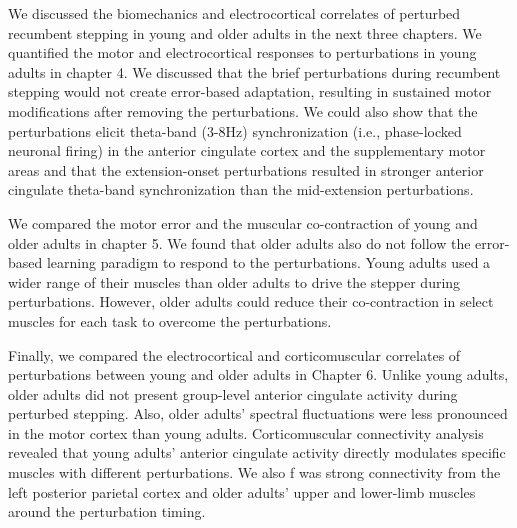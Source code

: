 \documentclass[../thesis_seyed.tex]{subfiles}
\begin{document}
We discussed the biomechanics and electrocortical correlates of perturbed recumbent stepping in young and older adults in the next three chapters. We quantified the motor and electrocortical responses to perturbations in young adults in chapter 4. We discussed that the brief perturbations during recumbent stepping would not create error-based adaptation, resulting in sustained motor modifications after removing the perturbations. We could also show that the perturbations elicit theta-band (3-8Hz) synchronization (i.e., phase-locked neuronal firing) in the anterior cingulate cortex and the supplementary motor areas and that the extension-onset perturbations resulted in stronger anterior cingulate theta-band synchronization than the mid-extension perturbations.

We compared the motor error and the muscular co-contraction of young and older adults in chapter 5. We found that older adults also do not follow the error-based learning paradigm to respond to the perturbations. Young adults used a wider range of their muscles than older adults to drive the stepper during perturbations. However, older adults could reduce their co-contraction in select muscles for each task to overcome the perturbations.

Finally, we compared the electrocortical and corticomuscular correlates of perturbations between young and older adults in Chapter 6. Unlike young adults, older adults did not present group-level anterior cingulate activity during perturbed stepping. Also, older adults' spectral fluctuations were less pronounced in the motor cortex than young adults. Corticomuscular connectivity analysis revealed that young adults' anterior cingulate activity directly modulates specific muscles with different perturbations. We also f was strong connectivity from the left posterior parietal cortex and older adults' upper and lower-limb muscles around the perturbation timing. 




\end{document}
